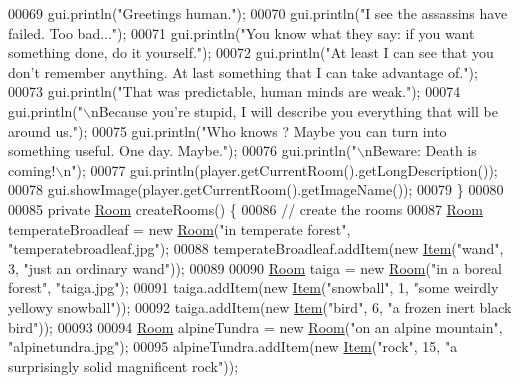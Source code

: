 \begin{DoxyCode}
00069         gui.println(\textcolor{stringliteral}{"Greetings human."});
00070         gui.println(\textcolor{stringliteral}{"I see the assassins have failed. Too bad..."});
00071         gui.println(\textcolor{stringliteral}{"You know what they say: if you want something done, do it yourself."});
00072         gui.println(\textcolor{stringliteral}{"At least I can see that you don't remember anything. At last something that I can take
       advantage of."});
00073         gui.println(\textcolor{stringliteral}{"That was predictable, human minds are weak."});
00074         gui.println(\textcolor{stringliteral}{"\(\backslash\)nBecause you're stupid, I will describe you everything that will be around us."});
00075         gui.println(\textcolor{stringliteral}{"Who knows ? Maybe you can turn into something useful. One day. Maybe."});
00076         gui.println(\textcolor{stringliteral}{"\(\backslash\)nBeware: Death is coming!\(\backslash\)n"});
00077         gui.println(player.getCurrentRoom().getLongDescription());
00078         gui.showImage(player.getCurrentRoom().getImageName());
00079     \}
00080 
00085     \textcolor{keyword}{private} \hyperlink{classRoom}{Room} createRooms() \{
00086         \textcolor{comment}{// create the rooms}
00087         \hyperlink{classRoom}{Room} temperateBroadleaf = \textcolor{keyword}{new} \hyperlink{classRoom}{Room}(\textcolor{stringliteral}{"in temperate forest"}, \textcolor{stringliteral}{"temperatebroadleaf.jpg"});
00088         temperateBroadleaf.addItem(\textcolor{keyword}{new} \hyperlink{classItem}{Item}(\textcolor{stringliteral}{"wand"}, 3, \textcolor{stringliteral}{"just an ordinary wand"}));
00089 
00090         \hyperlink{classRoom}{Room} taiga = \textcolor{keyword}{new} \hyperlink{classRoom}{Room}(\textcolor{stringliteral}{"in a boreal forest"}, \textcolor{stringliteral}{"taiga.jpg"});
00091         taiga.addItem(\textcolor{keyword}{new} \hyperlink{classItem}{Item}(\textcolor{stringliteral}{"snowball"}, 1, \textcolor{stringliteral}{"some weirdly yellowy snowball"}));
00092         taiga.addItem(\textcolor{keyword}{new} \hyperlink{classItem}{Item}(\textcolor{stringliteral}{"bird"}, 6, \textcolor{stringliteral}{"a frozen inert black bird"}));
00093 
00094         \hyperlink{classRoom}{Room} alpineTundra = \textcolor{keyword}{new} \hyperlink{classRoom}{Room}(\textcolor{stringliteral}{"on an alpine mountain"}, \textcolor{stringliteral}{"alpinetundra.jpg"});
00095         alpineTundra.addItem(\textcolor{keyword}{new} \hyperlink{classItem}{Item}(\textcolor{stringliteral}{"rock"}, 15, \textcolor{stringliteral}{"a surprisingly solid magnificent rock"}));

\end{DoxyCode}
